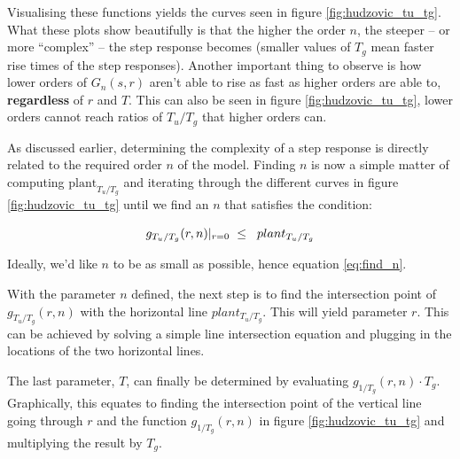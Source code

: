 Visualising   these   functions   yields    the    curves    seen    in   figure
\ref{fig:hudzovic_tu_tg}. What these plots show beautifully is  that  the higher
the order $n$, the steeper -- or more  ``complex''  -- the step response becomes
(smaller values of $T_g$ mean faster rise  times of the step responses). Another
important thing to observe is how lower orders of $G_n(s,r)$ aren't able to rise
as fast as higher orders are able to, \textbf{regardless} of $r$  and  $T$. This
can also be seen in figure \ref{fig:hudzovic_tu_tg},  lower  orders cannot reach
ratios of $T_u/T_g$ that higher orders can.

As discussed earlier, determining the complexity of a step  response is directly
related to the  required  order  $n$  of  the model. Finding $n$ is now a simple
matter  of  computing  $\textrm{plant}_{T_u/T_g}$  and  iterating   through  the
different  curves in figure \ref{fig:hudzovic_tu_tg} until we find an  $n$  that
satisfies the condition:

\begin{equation}
    g_{T_u/T_g}(r, n)\lvert_{r=0} \hspace{2mm} \le \hspace{2mm} plant_{T_u/T_g}
    \label{eq:find_n}
\end{equation}

Ideally,  we'd  like  $n$  to  be  as  small   as   possible,   hence   equation
\ref{eq:find_n}.

With the  parameter $n$ defined, the next step is to find the intersection point
of  $g_{T_u/T_g}(r, n)$ with the horizontal line  $plant_{T_u/T_g}$.  This  will
yield parameter $r$. This can be achieved by solving a simple  line intersection
equation  and  plugging  in  the   locations   of   the  two  horizontal  lines.

The last parameter, $T$, can finally be determined  by  evaluating $g_{1/T_g}(r,
n) \cdot T_g$. Graphically, this equates to finding the  intersection  point  of
the vertical line going through $r$ and the function $g_{1/T_g}(r, n)$ in figure
\ref{fig:hudzovic_tu_tg} and multiplying the result by $T_g$.

